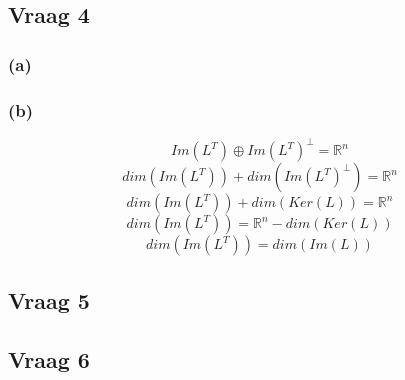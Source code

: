 \documentclass[lineaire_algebra_oplossingen.tex]{subfiles}
\begin{document}
\subsection{Vraag 4}
\subsubsection*{(a)}

\subsubsection*{(b)}
\[
Im(L^T) \oplus Im(L^T)^\bot = \mathbb{R}^n
\]
\[
dim(Im(L^T)) + dim(Im(L^T)^\bot) = \mathbb{R}^n
\]
\[
dim(Im(L^T)) + dim(Ker(L)) = \mathbb{R}^n
\]
\[
dim(Im(L^T)) = \mathbb{R}^n - dim(Ker(L))
\]
\[
dim(Im(L^T)) = dim(Im(L))
\]
\subsection{Vraag 5}


\subsection{Vraag 6}
\end{document}
